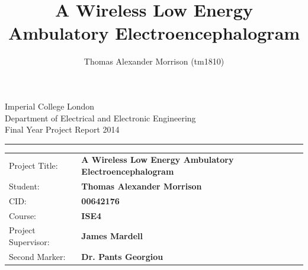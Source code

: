 \documentclass[]{article}
\title{A Wireless  Low Energy Ambulatory Electroencephalogram}
\author{Thomas Alexander Morrison (tm1810)}
\begin{document}
\maketitle

\begin{titlepage}
\setlength{\parindent}{0pt}
\setlength{\parskip}{0pt}

{
\Large
\raggedright
Imperial College London\\[17pt]
Department of Electrical and Electronic Engineering\\[17pt]
Final Year Project Report 2014\\[17pt]

}
\rule{\columnwidth}{3pt}

\vfill

\centering

\vfill

\setlength{\tabcolsep}{0pt}
\begin{tabular}{p{40mm}p{\dimexpr\columnwidth-40mm}}
Project Title: & \textbf{A Wireless  Low Energy Ambulatory Electroencephalogram} \\[12pt]
Student: & \textbf{Thomas Alexander Morrison} \\[12pt]
CID: & \textbf{00642176} \\[12pt]
Course: & \textbf{ISE4} \\[12pt]
Project Supervisor: & \textbf{James Mardell} \\[12pt]
Second Marker: & \textbf{Dr. Pants Georgiou} \\
\end{tabular}
\end{titlepage}

\clearpage





\clearpage
\end{document}

